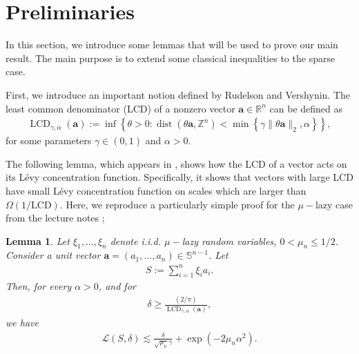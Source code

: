\documentclass{article}
\numberwithin{equation}{section}
\theoremstyle{plain}
\newtheorem{lemma}{Lemma}[section]
\begin{document}
\section{Preliminaries}\label{sec2}
In this section, we introduce some lemmas that will be used to prove our
main result. The main purpose is to extend some classical inequalities to the sparse case.
\par
First, we introduce an important notion defined by Rudelson and Vershynin. The least common denominator (LCD) of a nonzero vector $\boldsymbol{a} \in \mathbb{R}^n$ can be defined as
\begin{align*}
\operatorname{LCD}_{\gamma, \alpha}(\boldsymbol{a}):=\inf \left\{\theta>0: \operatorname{dist}\left(\theta \boldsymbol{a}, \mathbb{Z}^n\right) < \min \left\{\gamma\|\theta \boldsymbol{a}\|_2, \alpha\right\}\right\},
\end{align*}
for some parameters $\gamma \in(0,1)$ and $\alpha>0$.
\par
The following lemma, which appears in \cite{MR2407948}, shows how the LCD of a vector acts on its L\'{e}vy concentration function. Specifically, it shows that vectors with large LCD have small L\'{e}vy concentration function on scales which are larger than $\Omega(1 / \mathrm{LCD})$. Here, we reproduce a particularly simple proof for the $\mu-$lazy case from the lecture notes \cite{rudelson2013recentdevelopmentsnonasymptotictheory};
\begin{lemma}\label{lcd}
Let $\xi_1, \ldots, \xi_n$ denote i.i.d. $\mu-$lazy random variables, $0<\mu_{n}\leq1/2$. Consider a unit vector $\boldsymbol{a}=\left(a_1, \ldots, a_n\right) \in \mathbb{S}^{n-1}$. Let
\begin{align*}
S:=\sum_{i=1}^n \xi_i a_i.
\end{align*}
Then, for every $\alpha>0$, and for
\begin{align*}
\delta \geq \frac{(2 / \pi)}{\operatorname{LCD}_{\gamma, \alpha}(\boldsymbol{a})},
\end{align*}
we have
\begin{align*}
\mathcal{L}(S, \delta) \lesssim \frac{\delta}{\sqrt{\mu_{n}}\gamma}+\exp \left(-2\mu_{n}\alpha^2\right).
\end{align*}
\end{lemma}
\end{document}
